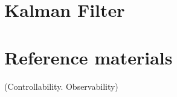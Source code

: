 \documentclass{article}
\begin{document}
\section{Kalman Filter}



\section{Reference materials}


(Controllability. Observability)




\end{document}

